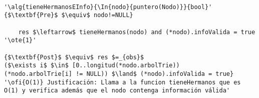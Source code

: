 \begin{lstlisting}[mathescape]

'\alg{tieneHermanosEInfo}{\In{nodo}{puntero(Nodo)}}{bool}'
{$\textbf{Pre}$ $\equiv$ nodo!=NULL}

	res $\leftarrow$ tieneHermanos(nodo) and (*nodo).infoValida = true '\ote{1}'

{$\textbf{Post}$ $\equiv$ res $=_{obs}$ 
($\exists i$ $\in$ [0..longitud(*nodo.arbolTrie)) 
(*nodo.arbolTrie[i] != NULL)) $\land$ (*nodo).infoValida = true}
'\ofi{O(1)} Justificación: Llama a la funcion tieneHermanos que es O(1) y verifica además que el nodo contenga información válida'

\end{lstlisting}